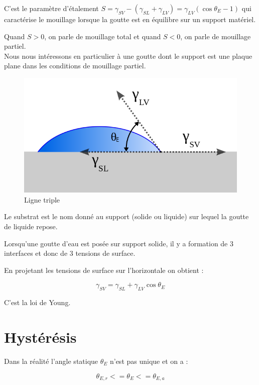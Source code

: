 \documentclass[french]{article}
\begin{document}
C'est le paramètre d'étalement $S = \gamma_{SV} - (\gamma_{SL} + \gamma_{LV}) = \gamma_{LV}(\cos\theta_{E} - 1)$ qui caractérise le mouillage lorsque la goutte est en équilibre sur un support matériel.

Quand $S > 0$, on parle de mouillage total et quand $S < 0$, on parle de mouillage partiel.\\

Nous nous intéressons en particulier à une goutte dont le support est une plaque plane dans les conditions de mouillage partiel. 
\begin{figure}[ht]
	\centering
	\includegraphics[scale = 0.3]{./image/Contact_angle2.png}
	\caption{Ligne triple}
\end{figure}



Le substrat est le nom donné au support (solide ou liquide) sur lequel la goutte de liquide repose.

Lorsqu'une goutte d'eau est posée sur support solide, il y a formation de 3 interfaces et donc de 3 tensions de surface.


En projetant les tensions de surface sur l'horizontale on obtient :

\begin{equation}
	\label{eq:Young}
	\gamma_{SV}  = \gamma_{SL} + \gamma_{LV}\cos\theta_{E}
\end{equation}

C'est la loi de Young.

\section{Hystérésis}


Dans la réalité l'angle statique $\theta_{E}$ n'est pas unique et on a :


\begin{equation}
	\theta_{E,r} <= \theta_{E} <= \theta_{E,a}
\end{equation}
\end{document}
